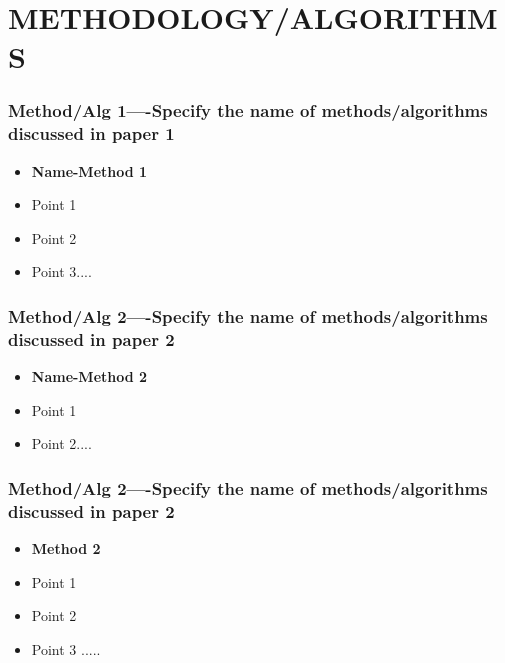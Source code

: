 \documentclass[c]{beamer}
\begin{document}
\section{METHODOLOGY/ALGORITHMS}

    \begin{frame} [c]
    \frametitle{Method/Alg 1----Specify the name of  methods/algorithms discussed in paper 1}
    \begin{itemize}
    \justifying
      \item \textbf{Name-Method 1}
      \item Point 1
      \item Point 2
      \item Point 3....
    \end{itemize}
        \end{frame}
        
\begin{frame} [c]
\frametitle{Method/Alg 2----Specify the name of  methods/algorithms discussed in paper 2}
    \begin{itemize}
    \justifying
        \item \textbf{Name-Method 2} 
    
   \item Point 1
   \item Point 2....
   \end{itemize}
\end{frame}
       
\begin{frame} [c]
\frametitle{Method/Alg 2----Specify the name of  methods/algorithms discussed in paper 2}
\begin{itemize}  
\justifying       
    \item \textbf{Method 2} 
\item Point 1
\item Point 2
\item Point 3 .....
\end{itemize}
\end{frame}
\end{document}
